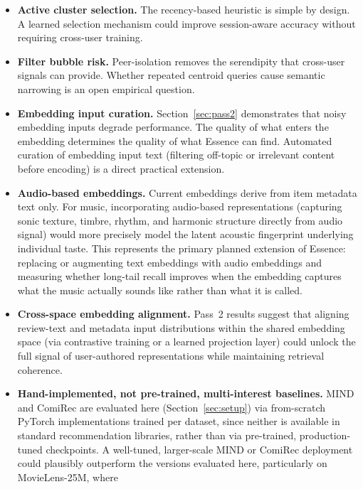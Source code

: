 \documentclass[11pt,a4paper]{article}
\begin{document}
\begin{itemize}[leftmargin=*, itemsep=3pt]
  \item \textbf{Active cluster selection.} The recency-based heuristic is
        simple by design. A learned selection mechanism could improve
        session-aware accuracy without requiring cross-user training.
  \item \textbf{Filter bubble risk.} Peer-isolation removes the serendipity
        that cross-user signals can provide. Whether repeated centroid queries
        cause semantic narrowing is an open empirical question.
  \item \textbf{Embedding input curation.} Section~\ref{sec:pass2}
        demonstrates that noisy embedding inputs degrade performance. The
        quality of what enters the embedding determines the quality of what
        Essence can find. Automated curation of embedding input text
        (filtering off-topic or irrelevant content before encoding) is a
        direct practical extension.
  \item \textbf{Audio-based embeddings.} Current embeddings derive from item
        metadata text only. For music, incorporating audio-based
        representations (capturing sonic texture, timbre, rhythm, and
        harmonic structure directly from audio signal) would more precisely
        model the latent acoustic fingerprint underlying individual taste.
        This represents the primary planned extension of Essence: replacing
        or augmenting text embeddings with audio embeddings and measuring
        whether long-tail recall improves when the embedding captures what
        the music actually sounds like rather than what it is called.
  \item \textbf{Cross-space embedding alignment.} Pass~2 results suggest that
        aligning review-text and metadata input distributions within the shared embedding space (via contrastive
        training or a learned projection layer) could unlock the full
        signal of user-authored representations while maintaining retrieval
        coherence.
  \item \textbf{Hand-implemented, not pre-trained, multi-interest baselines.}
        MIND and ComiRec are evaluated here (Section~\ref{sec:setup}) via
        from-scratch PyTorch implementations trained per dataset, since
        neither is available in standard recommendation libraries, rather
        than via pre-trained, production-tuned checkpoints. A well-tuned,
        larger-scale MIND or ComiRec deployment could plausibly outperform
        the versions evaluated here, particularly on MovieLens-25M, where

\end{itemize}
\end{document}
